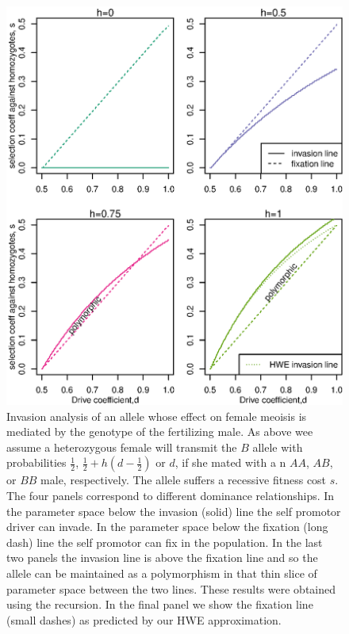 \documentclass[12pt,letterpaper]{article}
\begin{document}
\begin{figure}
\includegraphics[width = 0.8 \textwidth]{../Scripts/effect_of_dominance_on_invasion_space_four_graph.eps} 
\caption{Invasion analysis of an allele whose effect
 on female meoisis is mediated by the genotype of the fertilizing
 male.  As above wee assume a heterozygous female will transmit the $B$ allele 
  with probabilities  $\frac{1}{2}$,  $\frac{1}{2} + h(d-\frac{1}{2}) $ or $d$, 
 if she mated with a n $AA$, $AB$, or $BB$ male,  respectively.  The allele suffers a recessive fitness cost $s$.  
 The four panels correspond to different dominance relationships.
In the parameter space below the invasion (solid) line the self promotor
 driver can invade. In the parameter space below the fixation (long
 dash) line the self promotor can fix in the population. In the last
 two panels the invasion line is above the fixation line and so the
 allele can be maintained as a polymorphism in that thin slice of
 parameter space between the two lines. These results were 
  obtained using the recursion. In the final panel we show the
  fixation line (small dashes) as predicted by our HWE approximation.
}  \label{Effect_of_dominance}
\end{figure}
\end{document}
